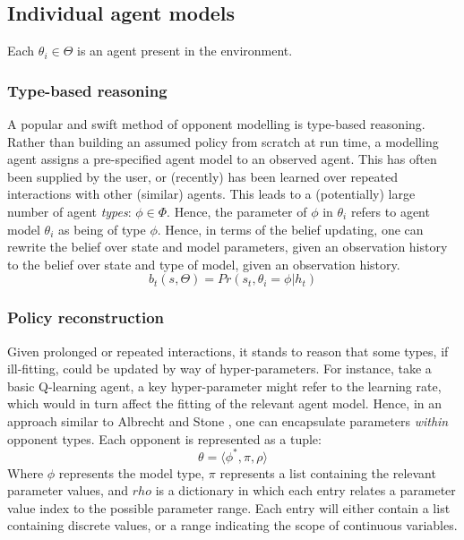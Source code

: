 \subsection{Individual agent models}
Each $\theta_i \in \Theta$ is an agent present in the environment.    
\subsubsection{Type-based reasoning}
A popular and swift method of opponent modelling is type-based reasoning. Rather than building an assumed policy from scratch at run time, a modelling agent assigns a pre-specified agent model to an observed agent. This has often been supplied by the user, or (recently) has been learned over repeated interactions with other (similar) agents. 
This leads to a (potentially) large number of agent \textit{types}: $\phi \in \Phi$.
\newline \newline
Hence, the parameter of $\phi$ in $\theta_i$ refers to agent model $\theta_i$ as being of type $\phi$. 
\newline \newline
Hence, in terms of the belief updating, one can rewrite the belief over state and model parameters, given an observation history to the belief over state and type of model, given an observation history. 
\begin{equation}
    b_t(s,\Theta) = Pr(s_t,\theta_i = \phi | h_t)
\end{equation}

 
\subsubsection{Policy reconstruction}
Given prolonged or repeated interactions, it stands to reason that some types, if ill-fitting, could be updated by way of hyper-parameters. For instance, take a basic Q-learning agent, a key hyper-parameter might refer to the learning rate, which would in turn affect the fitting of the relevant agent model. Hence, in an approach similar to Albrecht and Stone \cite{Albrecht_stone_2019}, one can encapsulate parameters \textit{within} opponent types. 
Each opponent is represented as a tuple:
\begin{equation} 
    \theta = \langle \phi^*, \pi, \rho \rangle
\end{equation}
Where $\phi$ represents the model type, $\pi$ represents a list containing the relevant parameter values, and $rho$ is a dictionary in which each entry relates a parameter value index to the possible parameter range. 
Each entry will either contain a list containing discrete values, or a range indicating the scope of continuous variables. 

